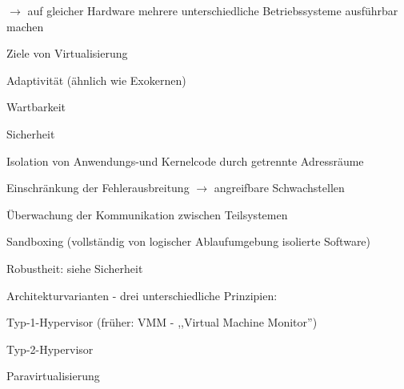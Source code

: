 \documentclass[a4paper]{article}
\begin{document}
\begin{multicols}{3}
\begin{center}
        $\rightarrow$ auf gleicher Hardware mehrere unterschiedliche Betriebssysteme ausführbar machen
    \end{center}
    Ziele von Virtualisierung
    \begin{itemize*}
        \item Adaptivität (ähnlich wie Exokernen) %
        \item Wartbarkeit
        \item Sicherheit
        \begin{itemize*}
            \item Isolation von Anwendungs-und Kernelcode durch getrennte Adressräume
            \item Einschränkung der Fehlerausbreitung $\rightarrow$ angreifbare Schwachstellen
            \item Überwachung der Kommunikation zwischen Teilsystemen
            \item Sandboxing (vollständig von logischer Ablaufumgebung isolierte Software)
        \end{itemize*}
        \item Robustheit: siehe Sicherheit
    \end{itemize*}

    Architekturvarianten - drei unterschiedliche Prinzipien:
    \begin{enumerate*}
        \item Typ-1-Hypervisor (früher: VMM - ,,Virtual Machine Monitor'')
        \item Typ-2-Hypervisor
        \item Paravirtualisierung
    \end{enumerate*}


\end{multicols}
\end{document}
